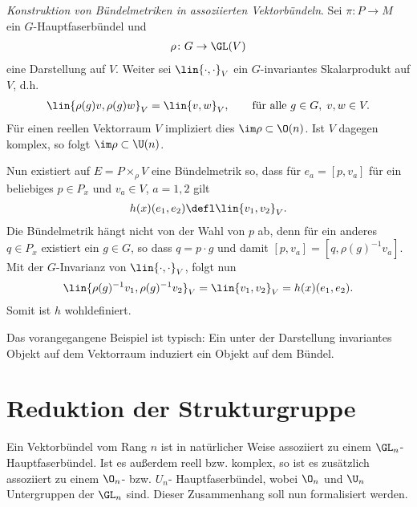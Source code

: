 \documentclass[%
	paper=a5,%
	fleqn,%
	DIV=18,%
	BCOR=0mm,
	fontsize=11pt,
	titlepage=false,%
	bibliography=totoc,
	DIV=18,%
	twoside=true,
	pdftitle=Riemannsche Geometrie,
	pdfauthor=Uwe Semmelmann,
	numbers=noendperiod]%
	{scrbook}
\begin{document}
\begin{ex}
\begin{exenum}
\item \textit{Konstruktion von Bündelmetriken in assoziierten Vektorbündeln}.
Sei $\pi\colon P\to M$ ein $G$-Hauptfaserbündel und
\begin{align*}
\rho\colon G\to \GL(V)
\end{align*}
eine Darstellung auf $V$. Weiter sei $\lin{\cdot,\cdot}_V$ ein $G$-invariantes
Skalarprodukt auf $V$, d.h.
\begin{align*}
\lin{\rho(g)v,\rho(g)w}_V = \lin{v,w}_V,\qquad \text{für alle }g\in G,\; v,w\in
V.
\end{align*}
Für einen reellen Vektorraum $V$ impliziert dies $\im
\rho\subset\O(n)$. Ist $V$ dagegen komplex, so folgt $\im\rho\subset\U(n)$.

Nun existiert auf $E=P\times_\rho V$ eine Bündelmetrik so, dass für $e_a =
[p,v_a]$ für ein beliebiges $p\in P_x$ und $v_a\in V$, $a=1,2$ gilt
\begin{align*}
h(x)(e_1,e_2) \defl \lin{v_1,v_2}_V.
\end{align*}
Die Bündelmetrik hängt nicht von der Wahl von $p$ ab, denn für ein anderes
$q\in P_x$ existiert ein $g\in G$, so dass $q = p\cdot g$ und damit $[p,v_a] =
[q,\rho(g)^{-1} v_a]$. Mit der $G$-Invarianz von $\lin{\cdot,\cdot}_V$, folgt
nun
\begin{align*}
\lin{\rho(g)^{-1}v_1,\rho(g)^{-1}v_2}_V = \lin{v_1,v_2}_V = h(x)(e_1,e_2).
\end{align*}
Somit ist $h$ wohldefiniert.
\item Das vorangegangene Beispiel ist typisch: Ein unter der Darstellung
invariantes Objekt auf dem Vektorraum induziert ein Objekt auf dem Bündel.\boxc  
\end{exenum}
\end{ex}

\section{Reduktion der Strukturgruppe}

Ein Vektorbündel vom Rang $n$ ist in natürlicher Weise assoziiert zu einem
$\GL_n$-Hauptfaserbündel. Ist es außerdem reell bzw. komplex, so ist es
zusätzlich assoziiert zu einem $\O_n$- bzw. $U_n$- Hauptfaserbündel, wobei
$\O_n$ und $\U_n$ Untergruppen der $\GL_n$ sind. Dieser Zusammenhang soll nun
formalisiert werden.
\end{document}
